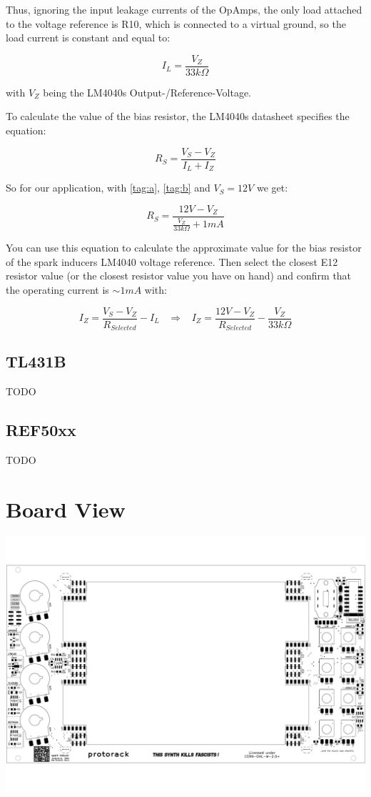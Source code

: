 \documentclass[12pt, a4paper]{article}
\begin{document}
Thus, ignoring the input leakage currents of the OpAmps, the only load attached to the voltage
reference is R10, which is connected to a virtual ground, so the load current is constant and
equal to:

\[ I_L = \frac{V_Z}{33k\Omega} \tag*{$(b)$}\label{tag:b} \]

with $V_Z$ being the LM4040s Output-/Reference-Voltage.

To calculate the value of the bias resistor, the LM4040s datasheet specifies the equation:

\[ R_S = \frac{V_S - V_Z}{I_L + I_Z} \tag*{$(1)$} \]

So for our application, with \ref{tag:a}, \ref{tag:b} and $V_S = 12V$ we get:

\[ R_S = \frac{12V - V_Z}{\frac{V_Z}{33k \Omega} + 1mA} \tag*{$(2)$} \]

You can use this equation to calculate the approximate value for the bias resistor of the
spark inducers LM4040 voltage reference. Then select the closest E12 resistor value
(or the closest resistor value you have on hand) and confirm that the operating current is
\enspace $\sim 1mA$ \enspace with:

\[
    I_Z = \frac{V_S - V_Z}{R_{Selected}} - I_L \;\;\; \Rightarrow \;\;\;
    I_Z = \frac{12V - V_Z}{R_{Selected}} - \frac{V_Z}{33k \Omega} \tag*{$(3)$}
\]

\subsection*{TL431B}
\label{ssec:appendix_tl431b}

TODO

\subsection*{REF50xx}

TODO

\pagebreak
\section*{Board View}
\includegraphics[angle=90, origin=c, width=\textwidth]{pdf/back_silkscreen.pdf}
\end{document}
